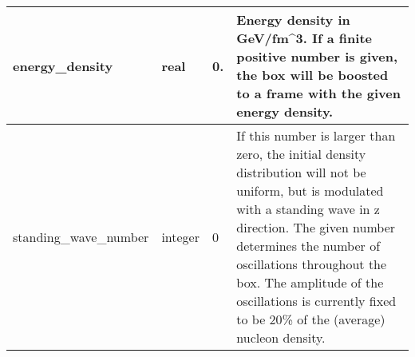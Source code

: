 \documentclass{article}
\begin{document}
\begin{longtable}{llll}
\midrule
energy\_density & \begin{minipage}[t]{2cm}real\end{minipage} & \begin{minipage}[t]{2cm}0.\end{minipage} & \begin{minipage}[t]{12cm}Energy density in GeV/fm\^{}3. If a finite positive number is given, the box will be boosted to a frame with the given energy density.\end{minipage}\\*
\midrule
standing\_wave\_number & \begin{minipage}[t]{2cm}integer\end{minipage} & \begin{minipage}[t]{2cm}0\end{minipage} & \begin{minipage}[t]{12cm}If this number is larger than zero, the initial density distribution will not be uniform, but is modulated with a standing wave in z direction. The given number determines the number of oscillations throughout the box. The amplitude of the oscillations is currently fixed to be 20\% of the (average) nucleon density.\end{minipage}\\*
\bottomrule
\end{longtable}
{ }



\end{document}
